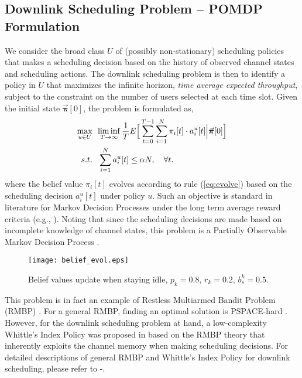\documentclass[11pt,twocolumn]{IEEEtran}
\begin{document}
\subsection{Downlink Scheduling Problem -- POMDP Formulation}
We consider the broad class $U$ of (possibly non-stationary) scheduling policies that makes a scheduling decision based on the history of observed channel states and scheduling actions.
The downlink scheduling problem is then to identify a policy in $U$ that maximizes the infinite horizon, \emph{time average expected throughput}, subject to the constraint on the number of users selected at each time slot. Given the initial state $\vec{\bm \pi}[0]$, the problem is formulated as,
\begin{align}
\max_{u \in U}& \hspace{5pt} \liminf_{T\rightarrow \infty} \frac{1}{T} E\Big[\sum_{t=0}^{T-1} \sum_{i=1}^N \pi_i[t] \cdot a^u_i[t] \Big | \vec{\bm \pi}[0] \Big] \label{eq:strgt_obj} \\
s.t.& \hspace{0.1in}  \sum_{i=1}^{N} a^u_i[t]\leq \alpha N , \quad \forall t. \label{eq:strgt}
\end{align}
where the belief value $\pi_i[t]$ evolves according to rule (\ref{eq:evolve}) based on the scheduling decision $a^u_i[t]$ under policy $u$. Such an objective is standard in literature for Markov Decision Processes under the long term average reward criteria (e.g., \cite{Eitan}). Noting that since the scheduling decisions are made based on incomplete knowledge of channel states, this problem is a Partially Observable Markov Decision Process \cite{Sondik_thesis}.

\begin{figure}
\centering
\texttt{[image: belief\_evol.eps]}
\caption{Belief values update when staying idle, $p_k=0.8$, $r_k=0.2$, $b^k_s=0.5$.}
\label{fig:Qupdate}
\end{figure}

This problem is in fact an example of Restless Multiarmed Bandit
Problem (RMBP) \cite{Whittle}. For a general RMBP, finding an
optimal solution is PSPACE-hard \cite{Tsitsiklis}. However, for the
downlink scheduling problem at hand, a low-complexity Whittle's Index Policy was proposed in \cite{Zhao_index}\cite{Infocom11} based on the RMBP
theory that inherently exploits the channel memory when making scheduling
decisions. For detailed descriptions of general RMBP
and Whittle's Index Policy for downlink scheduling, please refer to
\cite{Whittle}-\cite{Infocom11}.
\end{document}
